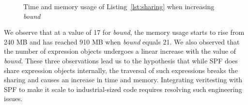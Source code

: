 \begin{figure}%
    \centering
    \qquad
    \caption{Time and memory usage of Listing~\ref{lst:sharing} when increasing \textit{bound}}%
    \label{fig:sharing}%
\end{figure}
%
We observe that at a value of 17 for \textit{bound}, the memory usage starts to rise from 240 MB and has reached 910 MB when \textit{bound} equals 21.
%
We also observed that the number of expression objects undergoes a linear increase with the value of \textit{bound}.
%
These three observations lead us to the hypothesis that while SPF does share expression objects internally, the traversal of such expressions breaks the sharing and causes an increase in time and memory.
%
Integrating veritesting with SPF to make it scale to industrial-sized code requires resolving such engineering issues.
%
